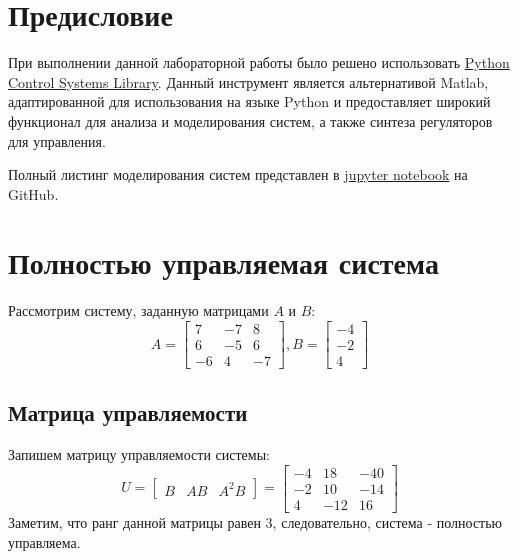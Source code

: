 \tableofcontents
\section*{Предисловие}
При выполнении данной лабораторной работы было решено использовать 
\href{https://python-control.readthedocs.io/en/0.9.4/}{Python Control Systems Library}.
Данный инструмент является альтернативой Matlab, адаптированной для использования на 
языке Python и предоставляет широкий функционал для анализа и моделирования систем,
а также синтеза регуляторов для управления.

Полный листинг моделирования систем представлен в \href{https://github.com/diuzhevVlad/control-theory-itmo-fall-2023/blob/main/Lab7/Lab7.ipynb}{jupyter notebook} на GitHub.

\pagebreak


\section{Полностью управляемая система}
Рассмотрим систему, заданную матрицами $A$ и $B$:
\begin{equation*}
    A = \begin{bmatrix}
        7 & -7 & 8 \\
        6 & -5 & 6 \\
        -6 & 4 & -7
    \end{bmatrix},
    B = \begin{bmatrix}
        -4 \\ -2 \\ 4
    \end{bmatrix}
\end{equation*}

\subsection{Матрица управляемости}
Запишем матрицу управляемости системы:
\begin{equation*}
    U = \begin{bmatrix}
        B & AB & A^2B 
    \end{bmatrix}
     = 
    \begin{bmatrix}
        -4 & 18 & -40 \\
        -2 & 10 & -14 \\
        4 & -12 & 16
    \end{bmatrix}
\end{equation*}
Заметим, что ранг данной матрицы равен 3, следовательно, система - полностью управляема.

